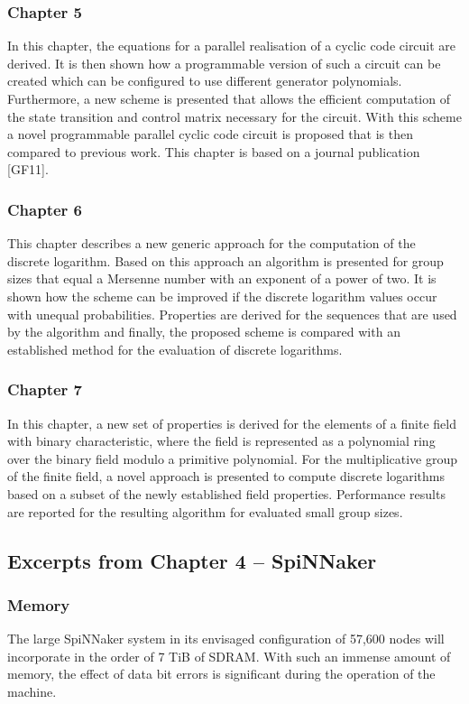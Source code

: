 \documentclass[a4paper, 11pt]{article}
\begin{document}
\subsubsection{Chapter 5}
In this chapter, the equations for a parallel realisation of a cyclic code circuit are derived. It is then shown how a programmable version of such a circuit can be created which can be configured to use different generator polynomials. Furthermore, a new scheme is presented that allows the efficient computation of the state transition and control matrix necessary for the circuit. With this scheme a novel programmable parallel cyclic code circuit is proposed that is then compared to previous work. This chapter is based on a journal publication [GF11].

\subsubsection{Chapter 6}
This chapter describes a new generic approach for the computation of the discrete logarithm. Based on this approach an algorithm is presented for group sizes that equal a Mersenne number with an exponent of a power of two. It is shown how the scheme can be improved if the discrete logarithm values occur with unequal probabilities. Properties are derived for the sequences that are used by the algorithm and finally, the proposed scheme is compared with an established method for the evaluation of discrete logarithms.

\subsubsection{Chapter 7}
In this chapter, a new set of properties is derived for the elements of a finite field with binary characteristic, where the field is represented as a polynomial ring over the binary field modulo a primitive polynomial. For the multiplicative group of the finite field, a novel approach is presented to compute discrete logarithms based on a subset of the newly established field properties. Performance results are reported for the resulting algorithm for evaluated small group sizes.


\subsection{Excerpts from Chapter 4 -- SpiNNaker}
\subsubsection{Memory}
The large SpiNNaker system in its envisaged configuration of 57,600 nodes will incorporate in the order of 7 TiB of SDRAM. With such an immense amount of memory, the effect of data bit errors is significant during the operation of the machine.
\end{document}
